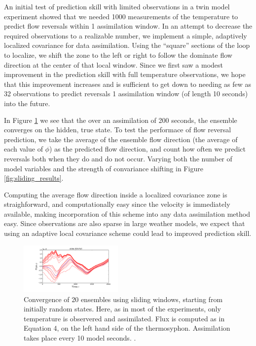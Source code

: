 An initial test of prediction skill with limited observations in a twin model experiment showed that we needed 1000 measurements of the temperature to predict flow reversals within 1 assimilation window.
In an attempt to decrease the required observations to a realizable number, we implement a simple, adaptively localized covariance for data assimilation.
Using the ``square'' sections of the loop to localize, we shift the zone to the left or right to follow the dominate flow direction at the center of that local window.
Since we first saw a modest improvement in the prediction skill with full temperature observations, we hope that this improvement increases and is sufficient to get down to needing as few as 32 observations to predict reversals 1 assimilation window (of length 10 seconds) into the future.

In Figure \ref{fig:sliding_spag} we see that the over an assimilation of 200 seconds, the ensemble converges on the hidden, true state.
To test the performace of flow reversal prediction, we take the average of the ensemble flow direction (the average of each value of $\phi$) as the predicted flow direction, and count how often we predict reversals both when they do and do not occur.
Varying both the number of model variables and the strength of convariance shifting in Figure \ref{fig:sliding_results}.

Computing the average flow direction inside a localized covariance zone is straighforward, and computationally easy since the velocity is immediately available, making incorporation of this scheme into any data assimilation method easy.
Since observations are also sparse in large weather models, we expect that using an adaptive local covariance scheme could lead to improved prediction skill.

\begin{figure}[t]
  \centering
  \includegraphics[width=0.45\textwidth]{../figures/loop-spaghetti-slide-004-full.png}
  \caption[]{
    Convergence of 20 ensembles using sliding windows, starting from initially random states.
    Here, as in most of the experiments, only temperature is observered and assimilated.
    Flux is computed as in Equation 4, on the left hand side of the thermosyphon.
    Assimilation takes place every 10 model seconds.
    .
  }
  \label{fig:sliding_spag}
\end{figure}

